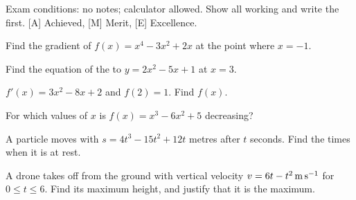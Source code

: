 \documentclass[11pt]{article}
\begin{document}
Exam conditions: no notes; calculator allowed. Show all working and write the \tderiv first. [A] Achieved, [M] Merit, [E] Excellence.

\Q{}
\begin{parts}
\item Find the gradient of $f(x)=x^{4}-3x^{2}+2x$ at the point where $x=-1$.
\item Find the equation of the \ttangent to $y=2x^{2}-5x+1$ at $x=3$.
\item $f'(x)=3x^{2}-8x+2$ and $f(2)=1$. Find $f(x)$.
\item For which values of $x$ is $f(x)=x^{3}-6x^{2}+5$ decreasing?
\end{parts}

\Q{}
\begin{parts}
\item A particle moves with $s=4t^{3}-15t^{2}+12t$ metres after $t$ seconds. Find the times when it is at rest.
\item A drone takes off from the ground with vertical velocity $v=6t-t^{2}\,\mathrm{m\,s^{-1}}$ for $0\le t\le6$. Find its maximum height, and justify that it is the maximum.
\end{parts}

\end{document}
